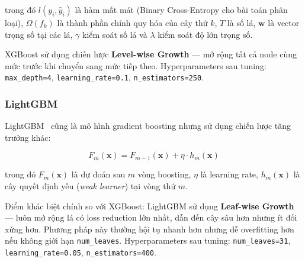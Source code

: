 trong đó $l(y_i, \hat{y}_i)$ là hàm mất mát (Binary Cross-Entropy cho bài toán phân loại), $\Omega(f_k)$ là thành phần chính quy hóa của cây thứ $k$, $T$ là số lá, $\mathbf{w}$ là vector trọng số tại các lá, $\gamma$ kiểm soát số lá và $\lambda$ kiểm soát độ lớn trọng số.

XGBoost sử dụng chiến lược \textbf{Level-wise Growth} --- mở rộng tất cả node cùng mức trước khi chuyển sang mức tiếp theo. Hyperparameters sau tuning: \texttt{max\_depth=4}, \texttt{learning\_rate=0.1}, \texttt{n\_estimators=250}.

\subsubsection{LightGBM}

LightGBM~\cite{ke2017lightgbm} cũng là mô hình gradient boosting nhưng sử dụng chiến lược tăng trưởng khác:

\begin{equation}
F_m(\mathbf{x}) = F_{m-1}(\mathbf{x}) + \eta \cdot h_m(\mathbf{x})
\label{eq:lightgbm}
\end{equation}

trong đó $F_m(\mathbf{x})$ là dự đoán sau $m$ vòng boosting, $\eta$ là learning rate, $h_m(\mathbf{x})$ là cây quyết định yếu (\textit{weak learner}) tại vòng thứ $m$.

Điểm khác biệt chính so với XGBoost: LightGBM sử dụng \textbf{Leaf-wise Growth} --- luôn mở rộng lá có loss reduction lớn nhất, dẫn đến cây sâu hơn nhưng ít đối xứng hơn. Phương pháp này thường hội tụ nhanh hơn nhưng dễ overfitting hơn nếu không giới hạn \texttt{num\_leaves}. Hyperparameters sau tuning: \texttt{num\_leaves=31}, \texttt{learning\_rate=0.05}, \texttt{n\_estimators=400}.
